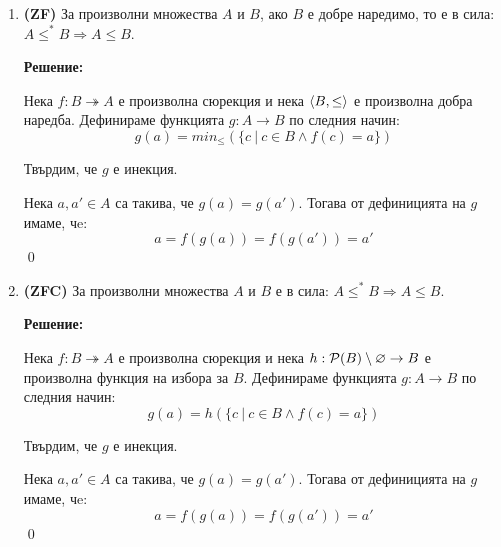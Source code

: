 \begin{problem}
\begin{enumerate}
\item
\textbf{(ZF)}
За произволни множества $A$ и $B$, ако $B$ е добре наредимо, то е в сила:
$A \leq^* B \Rightarrow A \leq B$.

\textbf{Решение:}

\smallbreak
\quad
Нека $f: B \twoheadrightarrow A$ е произволна сюрекция и нека $\langle B, \leq \rangle$ е произволна добра наредба.
Дефинираме функцията $g: A \rightarrow B$ по следния начин:
\[
g(a) = min_{\leq}(\{c\ |\ c \in B \land f(c) = a\})
\]

\quad
Твърдим, че $g$ е инекция.

\begin{tcolorbox}[mybox={Доказателство:}]
\quad
Нека $a, a' \in A$ са такива, че $g(a) = g(a')$.
Тогава от дефиницията на $g$ имаме, чe:
\[
a = f(g(a)) = f(g(a')) = a'
\]
\qed
\end{tcolorbox}


\item
\textbf{(ZFC)}
За произволни множества $A$ и $B$ е в сила:
$A \leq^* B \Rightarrow A \leq B$.

\textbf{Решение:}

\smallbreak
\quad
Нека $f: B \twoheadrightarrow A$ е произволна сюрекция
и нека $h: \mathcal{P}(B) \setminus \varnothing \to B$ е произволна функция на избора за $B$.
Дефинираме функцията $g: A \rightarrow B$ по следния начин:
\[
g(a) = h(\{c\ |\ c \in B \land f(c) = a\})
\]

\quad
Твърдим, че $g$ е инекция.

\begin{tcolorbox}[mybox={Доказателство:}]
\quad
Нека $a, a' \in A$ са такива, че $g(a) = g(a')$.
Тогава от дефиницията на $g$ имаме, чe:
\[
a = f(g(a)) = f(g(a')) = a'
\]
\qed
\end{tcolorbox}


\end{enumerate}
\end{problem}
